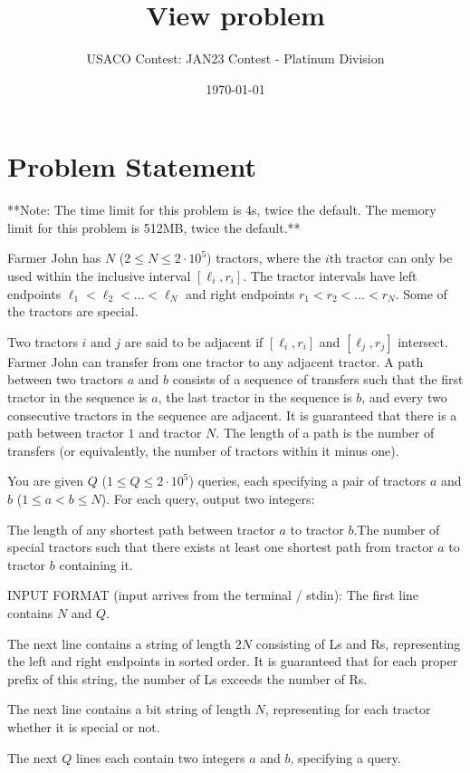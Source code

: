 \documentclass[12pt]{article}
\title{View problem}
\author{USACO Contest: JAN23 Contest - Platinum Division}
\date{\today}
\begin{document}
\maketitle

\section*{Problem Statement}


**Note: The time limit for this problem is 4s, twice the default. The memory
limit for this problem is 512MB, twice the default.**

Farmer John has $N$ ($2\le N\le 2\cdot 10^5$) tractors, where the $i$th tractor
can only be used within the inclusive interval $[\ell_i,r_i]$. The tractor intervals
have left endpoints $\ell_1<\ell_2<\dots<\ell_N$ and right endpoints $r_1<r_2<\dots<r_N$. 
Some of the tractors are special.

Two tractors $i$ and $j$ are said to be adjacent if $[\ell_i,r_i]$ and
$[\ell_j,r_j]$ intersect. Farmer John can transfer from one tractor to any adjacent tractor.
A path between two tractors $a$ and $b$ 
consists of a sequence of transfers such that the first tractor in the sequence
is $a$, the last tractor in the sequence is $b$, and every two consecutive 
tractors in the sequence are adjacent. It is guaranteed that there is a path 
between tractor $1$ and tractor $N$. The length of a path is the number of
transfers (or equivalently, the number of tractors within it minus one).

You are given $Q$ ($1\le Q\le 2\cdot 10^5$) queries, each specifying a pair of
tractors $a$ and $b$ ($1\le a<b\le N$). For each query, output two integers:

The length of any shortest path between tractor $a$ to tractor $b$.The number of special tractors such that there exists at least one shortest
path from tractor $a$ to tractor $b$ containing it.

INPUT FORMAT (input arrives from the terminal / stdin):
The first line contains $N$ and $Q$.

The next line contains a string of length $2N$ consisting of Ls and Rs,
representing the left and right endpoints in sorted order. It is guaranteed that
for each proper prefix of this string, the number of Ls exceeds the number of
Rs.

The next line contains a bit string of length $N$, representing for each
tractor whether it is special or not.

The next $Q$ lines each contain two integers $a$ and $b$, specifying a query.
\end{document}
